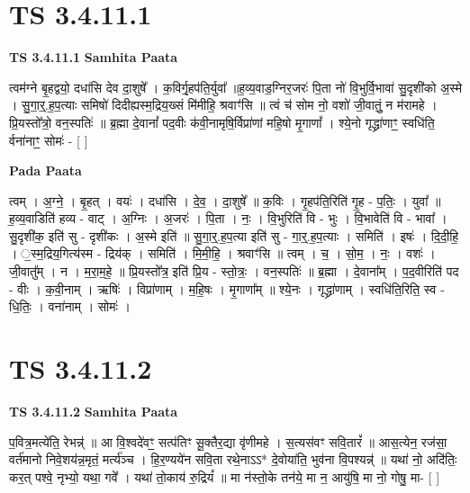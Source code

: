 \documentclass[17pt]{extarticle}
\begin{document}
\section*{ TS 3.4.11.1 }

\textbf{TS 3.4.11.1 } \newline
\textbf{Samhita Paata} \newline

त्वम॑ग्ने बृ॒हद्वयो॒ दधा॑सि देव दा॒शुषे᳚ । क॒विर्गृ॒हप॑ति॒र्युवा᳚ ॥ह॒व्य॒वाड॒ग्निर॒जरः॑ पि॒ता नो॑ वि॒भुर्वि॒भावा॑ सु॒दृशी॑को अ॒स्मे । सु॒गा॒र्॒.ह॒प॒त्याः समिषो॑ दिदीह्यस्म॒द्रिय॒ख्सं मि॑मीहि॒ श्रवाꣳ॑सि ॥ त्वं च॑ सोम नो॒ वशो॑ जी॒वातुं॒ न म॑रामहे । प्रि॒यस्तो᳚त्रो॒ वन॒स्पतिः॑ ॥ ब्र॒ह्मा दे॒वानां᳚ पद॒वीः क॑वी॒नामृषि॒र्विप्रा॑णां महि॒षो मृ॒गाणां᳚ । श्ये॒नो गृद्ध्रा॑णाꣳ॒॒ स्वधि॑ति॒ र्वना॑नाꣳ॒॒ सोमः॑ - [  ] \newline

\textbf{Pada Paata} \newline

त्वम् । अ॒ग्ने॒ । बृ॒हत् । वयः॑ । दधा॑सि । दे॒व॒ । दा॒शुषे᳚ ॥ क॒विः । गृ॒हप॑ति॒रिति॑ गृ॒ह - प॒तिः॒ । युवा᳚ ॥ ह॒व्य॒वाडिति॑ हव्य - वाट् । अ॒ग्निः । अ॒जरः॑ । पि॒ता । नः॒ । वि॒भुरिति॑ वि - भुः । वि॒भावेति॑ वि - भावा᳚ । सु॒दृशी॑क॒ इति॑ सु - दृशी॑कः । अ॒स्मे इति॑ ॥ सु॒गा॒र्॒.ह॒प॒त्या इति॑ सु - गा॒र्॒.ह॒प॒त्याः । समिति॑ । इषः॑ । दि॒दी॒हि॒ । ॒स्म॒द्रिय॒गित्य॑स्म - द्रिय॑क् । समिति॑ । मि॒मी॒हि॒ । श्रवाꣳ॑सि ॥ त्वम् । च॒ । सो॒म॒ । नः॒ । वशः॑ । जी॒वातु᳚म् । न । म॒रा॒म॒हे॒ ॥ प्रि॒यस्तो᳚त्र॒ इति॑ प्रि॒य - स्तो॒त्रः॒ । वन॒स्पतिः॑ ॥ ब्र॒ह्मा । दे॒वाना᳚म् । प॒द॒वीरिति॑ पद - वीः । क॒वी॒नाम् । ऋषिः॑ । विप्रा॑णाम् । म॒हि॒षः । मृ॒गाणा᳚म् ॥ श्ये॒नः । गृद्ध्रा॑णाम् । स्वधि॑ति॒रिति॒ स्व - धि॒तिः॒ । वना॑नाम् । सोमः॑ ।  \newline




\section*{ TS 3.4.11.2 }

\textbf{TS 3.4.11.2 } \newline
\textbf{Samhita Paata} \newline

प॒वित्र॒मत्ये॑ति॒ रेभन्न्॑ ॥ आ वि॒श्वदे॑वꣳ॒॒ सत्प॑तिꣳ सू॒क्तैर॒द्या वृ॑णीमहे । स॒त्यस॑वꣳ सवि॒तारं᳚ ॥ आस॒त्येन॒ रज॑सा॒ वर्त॑मानो निवे॒शय॑न्न॒मृतं॒ मर्त्य॑ञ्च । हि॒र॒ण्यये॑न सवि॒ता रथे॒नाऽऽ* दे॒वोया॑ति॒ भुव॑ना वि॒पश्यन्न्॑ ॥ यथा॑ नो॒ अदि॑तिः॒ कर॒त् पश्वे॒ नृभ्यो॒ यथा॒ गवे᳚ । यथा॑ तो॒काय॑ रु॒द्रियं᳚ ॥ मा न॑स्तो॒के तन॑ये॒ मा न॒ आयु॑षि॒ मा नो॒ गोषु॒ मा- [  ] \newline
\end{document}
